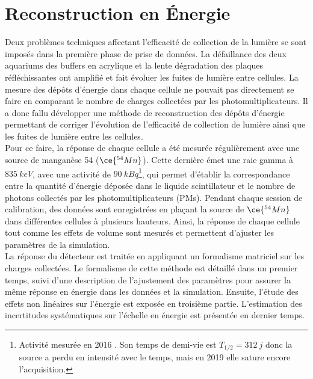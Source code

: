 

\chapter{Reconstruction en \'Energie}
\label{chap:chapitre_energie}

\minitoc

\newpage

Deux problèmes techniques affectant l'efficacité de collection de la lumière se sont imposés dans la première phase de prise de données. La défaillance des deux aquariums des buffers en acrylique et la lente dégradation des plaques réfléchissantes ont amplifié et fait évoluer les fuites de lumière entre cellules. La mesure des dépôts d'énergie dans chaque cellule ne pouvait pas directement se faire en comparant le nombre de charges collectées par les photomultiplicateurs. Il a donc fallu développer une méthode de reconstruction des dépôts d'énergie permettant de corriger l'évolution de l'efficacité de collection de lumière ainsi que les fuites de lumière entre les cellules.\\

Pour ce faire, la réponse de chaque cellule a été mesurée régulièrement avec une source de manganèse 54 ($\ce{^{54}Mn}$). Cette dernière émet une raie gamma à $\SI{835}{keV}$, avec une activité de $\SI{90}{kBq}$\footnote{Activité mesurée en 2016 \cite{docdb136}. Son temps de demi-vie est $T_{1/2} = \SI{312}{j}$ donc la source a perdu en intensité avec le temps, mais en 2019 elle sature encore l'acquisition.}, qui permet d'établir la correspondance entre la quantité d'énergie déposée dans le liquide scintillateur et le nombre de photons collectés par les photomultiplicateurs (PMs). Pendant chaque session de calibration, des données sont enregistrées en plaçant la source de $\ce{^{54}Mn}$ dans différentes cellules à plusieurs hauteurs. Ainsi, la réponse de chaque cellule tout comme les effets de volume sont mesurés et permettent d'ajuster les paramètres de la simulation.\\

La réponse du détecteur est traitée en appliquant un formalisme matriciel sur les charges collectées. Le formalisme de cette méthode est détaillé dans un premier temps, suivi d'une description de l'ajustement des paramètres pour assurer la même réponse en énergie dans les données et la simulation. Ensuite, l'étude des effets non linéaires sur  l'énergie est exposée en troisième partie. L'estimation des incertitudes systématiques sur l'échelle en énergie est présentée en dernier temps.\\


